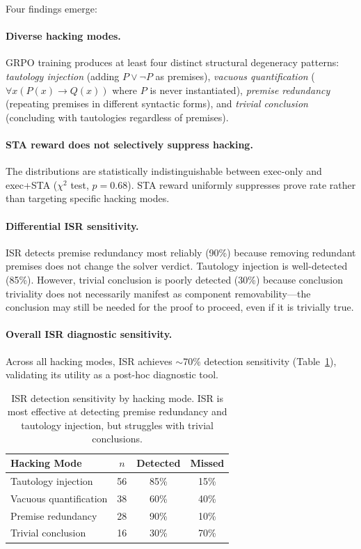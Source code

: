 \documentclass[11pt,a4paper]{article}
\begin{document}
Four findings emerge:

\paragraph{Diverse hacking modes.}
GRPO training produces at least four distinct structural degeneracy patterns: \emph{tautology injection} (adding $P \vee \neg P$ as premises), \emph{vacuous quantification} ($\forall x(P(x) \to Q(x))$ where $P$ is never instantiated), \emph{premise redundancy} (repeating premises in different syntactic forms), and \emph{trivial conclusion} (concluding with tautologies regardless of premises).

\paragraph{STA reward does not selectively suppress hacking.}
The distributions are statistically indistinguishable between exec-only and exec+STA ($\chi^2$ test, $p = 0.68$).
STA reward uniformly suppresses prove rate rather than targeting specific hacking modes.

\paragraph{Differential ISR sensitivity.}
ISR detects premise redundancy most reliably (90\%) because removing redundant premises does not change the solver verdict.
Tautology injection is well-detected (85\%).
However, trivial conclusion is poorly detected (30\%) because conclusion triviality does not necessarily manifest as component removability---the conclusion may still be needed for the proof to proceed, even if it is trivially true.

\paragraph{Overall ISR diagnostic sensitivity.}
Across all hacking modes, ISR achieves $\sim$70\% detection sensitivity (Table~\ref{tab:isr-sensitivity}), validating its utility as a post-hoc diagnostic tool.

\begin{table}[t]
\centering
\small
\begin{tabular}{lccc}
\toprule
\textbf{Hacking Mode} & \textbf{$n$} & \textbf{Detected} & \textbf{Missed} \\
\midrule
Tautology injection    & 56 & 85\% & 15\% \\
Vacuous quantification & 38 & 60\% & 40\% \\
Premise redundancy     & 28 & 90\% & 10\% \\
Trivial conclusion     & 16 & 30\% & 70\% \\
\bottomrule
\end{tabular}
\caption{ISR detection sensitivity by hacking mode. ISR is most effective at detecting premise redundancy and tautology injection, but struggles with trivial conclusions.}
\label{tab:isr-sensitivity}
\end{table}
\end{document}

